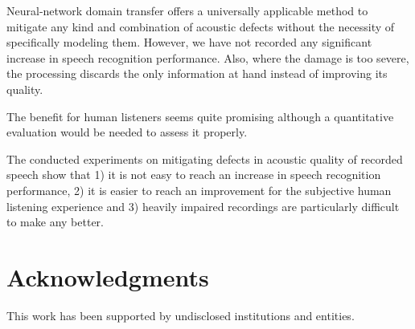 \documentclass[runningheads]{llncs}
\begin{document}
Neural-network domain transfer offers a universally applicable method to
mitigate any kind and combination of acoustic defects without the necessity
of specifically modeling them. However,
we have not recorded any significant increase in speech recognition performance.
Also, where the damage is too severe, the processing discards the only
information at hand instead of improving its quality.

The benefit for human listeners seems quite promising although a quantitative
evaluation would be needed to assess it properly.

The conducted experiments on mitigating defects in acoustic quality of recorded speech
show that 1) it is not easy to reach an increase in speech recognition
performance, 2) it is easier to reach an improvement for the subjective
human listening experience and 3) heavily impaired recordings are particularly difficult to
make any better.

\section*{Acknowledgments}

This work has been supported by undisclosed institutions and entities.






\end{document}

